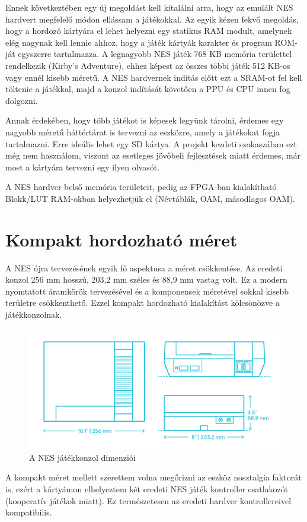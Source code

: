 Ennek következtében egy új megoldást kell kitalálni arra, hogy az emulált NES hardvert megfelelő módon ellássam a játékokkal. Az egyik kézen fekvő megoldás, hogy a hordozó kártyára el lehet helyezni egy statikus RAM modult, amelynek elég nagynak kell lennie ahhoz, hogy a játék kártyák karakter és program ROM-ját egyszerre tartalmazza. A legnagyobb NES játék 768 KB memória területtel rendelkezik (Kirby's Adventure), ehhez képest az összes többi játék 512 KB-os vagy ennél kisebb méretű. A NES hardvernek indítás előtt ezt a SRAM-ot fel kell töltenie a játékkal, majd a konzol indítását követően a PPU és CPU innen fog dolgozni.

Annak érdekében, hogy több játékot is képesek legyünk tárolni, érdemes egy nagyobb méretű háttértárat is tervezni az eszközre, amely a játékokat fogja tartalmazni. Erre ideális lehet egy SD kártya. A projekt kezdeti szakaszában ezt még nem használom, viszont az esetleges jövőbeli fejlesztések miatt érdemes, már most a kártyára tervezni egy ilyen olvasót.

A NES hardver belső memória területeit, pedig az FPGA-ban kialakítható Blokk/LUT RAM-okban helyezhetjük el (Névtáblák, OAM, másodlagos OAM).

\section{Kompakt hordozható méret}
\label{sec:Size}

A NES újra tervezésének egyik fő aspektusa a méret csökkentése. Az eredeti konzol 256 mm hosszú, 203,2 mm széles és 88,9 mm vastag volt. Ez a modern nyomtatott áramkörök tervezésével és a komponensek méretével sokkal kisebb területre csökkenthető. Ezzel kompakt hordozható kialakítást kölcsönözve a játékkonzolnak.

\begin{figure}[H]
	\centering
	\includegraphics[width=150mm, keepaspectratio]{figures/NES-size}
	\caption{A NES játékkonzol dimenziói \cite{NES_dimensions}}
	\label{fig:NES-size}
\end{figure}

A kompakt méret mellett szerettem volna megőrizni az eszköz nosztalgia faktorát is, ezért a kártyámon elhelyeztem két eredeti NES játék kontroller csatlakozót (kooperatív játékok miatt). Ez természetesen az eredeti hardver kontrollereivel kompatibilis.


